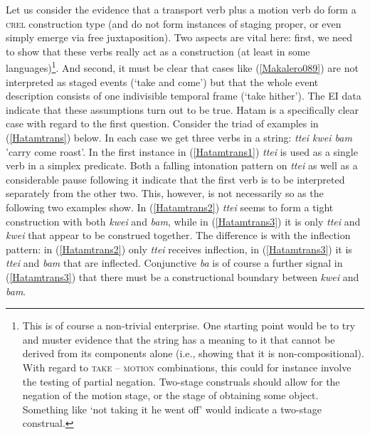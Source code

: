 Let us consider the evidence that a transport verb plus a motion verb do form a \textsc{crel} construction type (and do not form instances of staging proper, or even simply emerge via free juxtaposition). Two aspects are vital here: first, we need to show that these verbs really act as a construction (at least in some languages)\footnote{This is of course a non-trivial enterprise. One starting point would be to try and muster evidence that the string has a meaning to it that cannot be derived from its components alone (i.e., showing that it is non-compositional). With regard to \textsc{take} -- \textsc{motion} combinations, this could for instance involve the testing of partial negation. Two-stage construals should allow for the negation of the motion stage, or the stage of obtaining some object. Something like `not taking it he went off' would indicate a two-stage construal.}. And second, it must be clear that cases like (\ref{Makalero089}) are not interpreted as staged events (`take and come') but that the whole event description consists of one indivisible temporal frame (`take hither'). The EI data indicate that these assumptions turn out to be true. Hatam is a specifically clear case with regard to the first question. Consider the triad of examples in (\ref{Hatamtrans}) below. In each case we get three verbs in a string: \textit{ttei kwei bam} 'carry come roast'. In the first instance in (\ref{Hatamtrans1}) \textit{ttei} is used as a single verb in a simplex predicate. Both a falling intonation pattern on \textit{ttei} as well as a considerable pause following it indicate that the first verb is to be interpreted separately from the other two. This, however, is not necessarily so as the following two examples show. In (\ref{Hatamtrans2}) \textit{ttei} seems to form a tight construction with both \textit{kwei} and \textit{bam}, while in (\ref{Hatamtrans3}) it is only \textit{ttei} and \textit{kwei} that appear to be construed together. The difference is with the inflection pattern: in (\ref{Hatamtrans2}) only \textit{ttei} receives inflection, in (\ref{Hatamtrans3}) it is \textit{ttei} and \textit{bam} that are inflected. Conjunctive \textit{ba} is of course a further signal in (\ref{Hatamtrans3}) that there must be a constructional boundary between \textit{kwei} and \textit{bam}.

